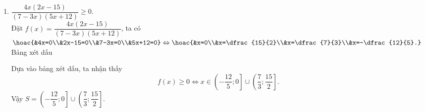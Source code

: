 \begin{bt}
{\begin{enumerate}
			\item $\dfrac{4x(2x-15)}{(7-3x)(5x+12)}\ge 0$.\\
			Đặt $f(x)=\dfrac{4x(2x-15)}{(7-3x)(5x+12)}$, ta có $\hoac{&4x=0\\&2x-15=0\\&7-3x=0\\&5x+12=0} \Leftrightarrow \hoac{&x=0\\&x=\dfrac{15}{2}\\&x=\dfrac{7}{3}\\&x=-\dfrac{12}{5}.}$\\
			Bảng xét dấu
			\begin{center}
			\end{center}
			Dựa vào bảng xét dấu, ta nhận thấy
			$$f(x)\ge 0 \Leftrightarrow x\in \left(-\dfrac{12}{5};0\right]\cup \left(\dfrac{7}{3};\dfrac{15}{2}\right]. $$
			Vậy $S=\left(-\dfrac{12}{5};0\right]\cup \left(\dfrac{7}{3};\dfrac{15}{2}\right]. $
		\end{enumerate}
	}
\end{bt}

